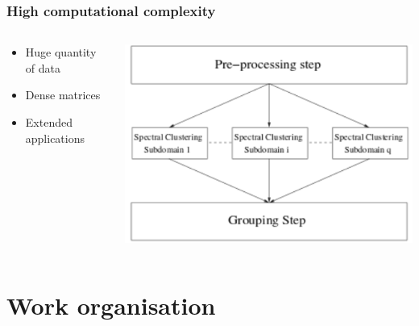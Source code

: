 \documentclass[10p]{beamer}
\begin{document}
\begin{frame}
\frametitle{High computational complexity}
\begin{columns}
\begin{column}{0.4\textwidth}
\begin{itemize}
\item Huge quantity of data
\item Dense matrices
\item Extended applications
\end{itemize}
\end{column}
\begin{column}{0.6\textwidth}
\includegraphics[width=\columnwidth]{Image/parallel.png}
\end{column}
\end{columns}
\end{frame}
\section{Work organisation}
\end{document}
